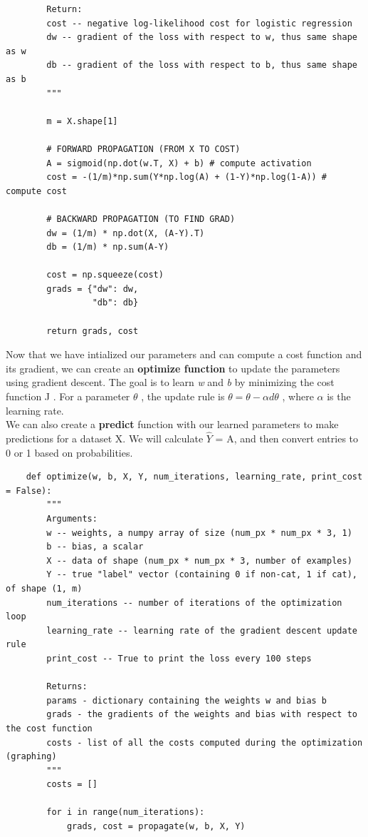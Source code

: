 \documentclass[11pt, a4paper]{article}
\begin{document}
\begin{spacing}{1.1}
\begin{lstlisting}
		Return:
		cost -- negative log-likelihood cost for logistic regression
		dw -- gradient of the loss with respect to w, thus same shape as w
		db -- gradient of the loss with respect to b, thus same shape as b
		"""
		
		m = X.shape[1]
		
		# FORWARD PROPAGATION (FROM X TO COST)
		A = sigmoid(np.dot(w.T, X) + b) # compute activation
		cost = -(1/m)*np.sum(Y*np.log(A) + (1-Y)*np.log(1-A)) # compute cost
		
		# BACKWARD PROPAGATION (TO FIND GRAD)
		dw = (1/m) * np.dot(X, (A-Y).T)
		db = (1/m) * np.sum(A-Y)
		
		cost = np.squeeze(cost)
		grads = {"dw": dw,
		         "db": db}
		
		return grads, cost \end{lstlisting} \vspace*{1mm} 
	Now that we have intialized our parameters and can compute a cost function and its gradient, we can create an  \textbf{optimize function} to update the parameters using gradient descent. The goal is to learn \textit{w}  and \textit{b} by minimizing the cost function J . For a parameter $\theta$ , the update rule is $\theta = \theta - \alpha d\theta$ , where $\alpha$  is the learning rate. \vspace*{1mm} \\
	We can also create a \textbf{predict} function with our learned parameters to make predictions for a dataset X. We will calculate $\hat{Y}$ = A, and then convert entries to 0 or 1 based on probabilities. \newpage

	\begin{lstlisting}
	def optimize(w, b, X, Y, num_iterations, learning_rate, print_cost = False):
		"""
		Arguments:
		w -- weights, a numpy array of size (num_px * num_px * 3, 1)
		b -- bias, a scalar
		X -- data of shape (num_px * num_px * 3, number of examples)
		Y -- true "label" vector (containing 0 if non-cat, 1 if cat), of shape (1, m)
		num_iterations -- number of iterations of the optimization loop
		learning_rate -- learning rate of the gradient descent update rule
		print_cost -- True to print the loss every 100 steps
		
		Returns:
		params - dictionary containing the weights w and bias b
		grads - the gradients of the weights and bias with respect to the cost function
		costs - list of all the costs computed during the optimization (graphing)
		"""
		costs = []
		
		for i in range(num_iterations):
			grads, cost = propagate(w, b, X, Y)
			

\end{lstlisting}
\end{spacing}
\end{document}
